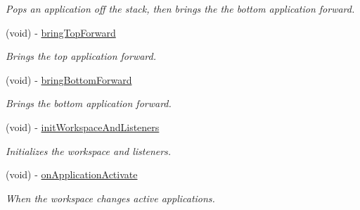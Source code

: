 \begin{DoxyCompactItemize}
\begin{DoxyCompactList}\small\item\em Pops an application off the stack, then brings the the bottom application forward. \item\end{DoxyCompactList}\item 
\hypertarget{interface_g_d_active_application_stack_ade441263784486ef6b06992b51d0b7bd}{
(void) -\/ \hyperlink{interface_g_d_active_application_stack_ade441263784486ef6b06992b51d0b7bd}{bringTopForward}}
\label{interface_g_d_active_application_stack_ade441263784486ef6b06992b51d0b7bd}

\begin{DoxyCompactList}\small\item\em Brings the top application forward. \item\end{DoxyCompactList}\item 
\hypertarget{interface_g_d_active_application_stack_a160fa1a7f45df169168c7c1aebd98290}{
(void) -\/ \hyperlink{interface_g_d_active_application_stack_a160fa1a7f45df169168c7c1aebd98290}{bringBottomForward}}
\label{interface_g_d_active_application_stack_a160fa1a7f45df169168c7c1aebd98290}

\begin{DoxyCompactList}\small\item\em Brings the bottom application forward. \item\end{DoxyCompactList}\item 
\hypertarget{interface_g_d_active_application_stack_a8686d384529748f578fdc1b82d829656}{
(void) -\/ \hyperlink{interface_g_d_active_application_stack_a8686d384529748f578fdc1b82d829656}{initWorkspaceAndListeners}}
\label{interface_g_d_active_application_stack_a8686d384529748f578fdc1b82d829656}

\begin{DoxyCompactList}\small\item\em Initializes the workspace and listeners. \item\end{DoxyCompactList}\item 
\hypertarget{interface_g_d_active_application_stack_aa5c4c884f50cf0e1d18dc909ed7af8e7}{
(void) -\/ \hyperlink{interface_g_d_active_application_stack_aa5c4c884f50cf0e1d18dc909ed7af8e7}{onApplicationActivate}}
\label{interface_g_d_active_application_stack_aa5c4c884f50cf0e1d18dc909ed7af8e7}

\begin{DoxyCompactList}\small\item\em When the workspace changes active applications. \item\end{DoxyCompactList}\end{DoxyCompactItemize}
